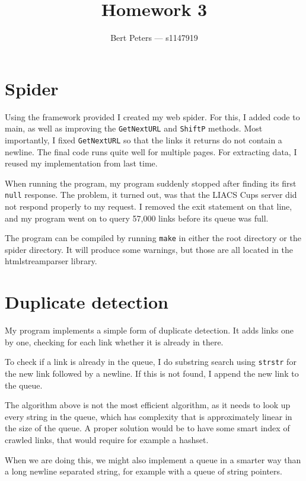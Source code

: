 \documentclass[10pt,a4paper]{article}
\author{Bert Peters --- s1147919}
\title{Homework 3}
\begin{document}
\maketitle

\section{Spider}

Using the framework provided I created my web spider. For this, I added code to main, as well as improving the \texttt{GetNextURL} and \texttt{ShiftP} methods. Most importantly, I fixed \texttt{GetNextURL} so that the links it returns do not contain a newline. The final code runs quite well for multiple pages. For extracting data, I reused my implementation from last time.

When running the program, my program suddenly stopped after finding its first \texttt{null} response. The problem, it turned out, was that the LIACS Cups server did not respond properly to my request. I removed the exit statement on that line, and my program went on to query 57,000 links before its queue was full.

The program can be compiled by running \texttt{make} in either the root directory or the spider directory. It will produce some warnings, but those are all located in the htmlstreamparser library.

\section{Duplicate detection}

My program implements a simple form of duplicate detection. It adds links one by one, checking for each link whether it is already in there.

To check if a link is already in the queue, I do substring search using \texttt{strstr} for the new link followed by a newline. If this is not found, I append the new link to the queue.

The algorithm above is not the most efficient algorithm, as it needs to look up every string in the queue, which has complexity that is approximately linear in the size of the queue. A proper solution would be to have some smart index of crawled links, that would require for example a hashset.

When we are doing this, we might also implement a queue in a smarter way than a long newline separated string, for example with a queue of string pointers.
\end{document}
